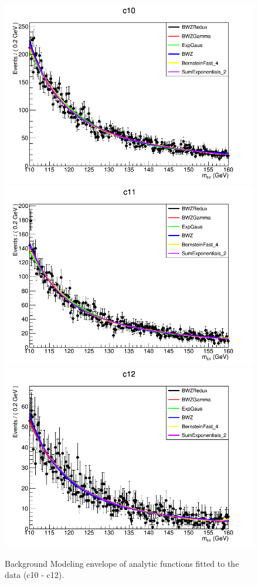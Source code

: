 \begin{figure}[htbp]
  \centering
  \includegraphics[width=0.65\linewidth]{figures/ch_higgs/backgroundmodel/uf_bdt/backgroundFits__c10__bkgModels.png}\\
  \includegraphics[width=0.65\linewidth]{figures/ch_higgs/backgroundmodel/uf_bdt/backgroundFits__c11__bkgModels.png}\\
  \includegraphics[width=0.65\linewidth]{figures/ch_higgs/backgroundmodel/uf_bdt/backgroundFits__c12__bkgModels.png}
  \caption{Background Modeling envelope of analytic functions fitted to the data (c10 - c12).}
  \label{fig:higgs_bmodel_bdtc10c12}
\end{figure}